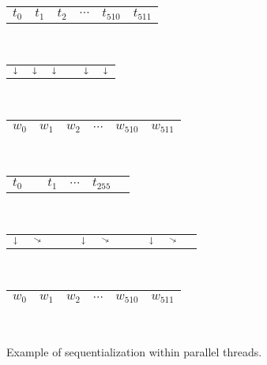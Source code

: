 \begin{figure}
  \centering
  \begin{minipage}{0.45\textwidth}
    \centering
      \begin{tabular}{C{0.6cm}C{0.6cm}C{0.6cm}C{0.6cm}C{0.6cm}C{0.6cm}}
        $t_0$ & $t_1$ & $t_2$ & $\cdots$ & $t_{510}$ & $t_{511}$\\
      \end{tabular}\\[-0.5ex]
      \begin{tabular}{C{0.6cm}C{0.6cm}C{0.6cm}C{0.6cm}C{0.6cm}C{0.6cm}}
        $\shortdownarrow$ & $\shortdownarrow$ & $\shortdownarrow$ & & $\shortdownarrow$ & $\shortdownarrow$\\
      \end{tabular}\\[-0.5ex]
      \begin{tabular}{|C{0.6cm}|C{0.6cm}|C{0.6cm}|C{0.6cm}|C{0.6cm}|C{0.6cm}|}
        \hline
        $w_0$ & $w_1$ & $w_2$ & $\cdots$ & $w_{510}$ & $w_{511}$\\
        \hline
      \end{tabular}\\
    \end{minipage}
    \begin{minipage}{0.45\textwidth}
      \centering
      \begin{tabular}{C{0.6cm}C{0.6cm}C{0.6cm}C{0.6cm}C{0.6cm}C{0.6cm}}
        $t_0$ &  & $t_1$ & $\cdots$ & $t_{255}$ & \\
      \end{tabular}\\[-0.5ex]
      \begin{tabular}{C{0.105cm}C{0.105cm}C{0.105cm}C{0.105cm}C{0.105cm}C{0.105cm}C{0.105cm}C{0.105cm}C{0.105cm}C{0.105cm}C{0.105cm}}
        $\shortdownarrow$ & $\diagonalarrowdown$ &  &  & $\shortdownarrow$ & $\diagonalarrowdown$ &  &  & $\shortdownarrow$ & $\diagonalarrowdown$ & \\
      \end{tabular}\\[-0.5ex]
      \begin{tabular}{|C{0.6cm}|C{0.6cm}|C{0.6cm}|C{0.6cm}|C{0.6cm}|C{0.6cm}|}
        \hline
        $w_0$ & $w_1$ & $w_2$ & $\cdots$ & $w_{510}$ & $w_{511}$\\
        \hline
      \end{tabular}\\
    \end{minipage}
    \caption{\footnotesize Example of sequentialization within parallel threads.}
    \label{fig:seqexa}
\end{figure}

